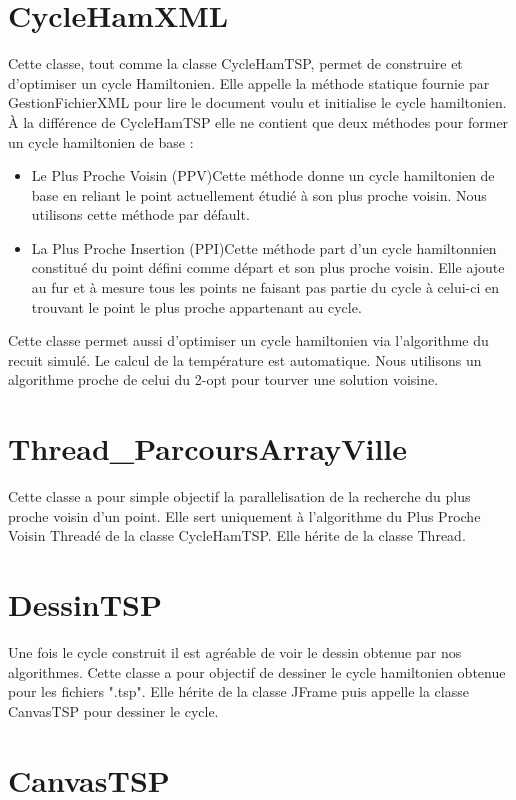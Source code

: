 \documentclass{article}
\begin{document}
\section{CycleHamXML}

Cette classe, tout comme la classe CycleHamTSP, permet de construire et d'optimiser un cycle Hamiltonien.
Elle appelle la méthode statique fournie par GestionFichierXML pour lire le document voulu et initialise le cycle hamiltonien.
À la différence de CycleHamTSP elle ne contient que deux méthodes pour former un cycle hamiltonien de base :
\begin{itemize}
\item{Le Plus Proche Voisin (PPV)}{Cette méthode donne un cycle hamiltonien de base en reliant le point actuellement étudié à son plus proche voisin. Nous utilisons cette méthode par défault.}
\item{La Plus Proche Insertion (PPI)}{Cette méthode part d'un cycle hamiltonnien constitué du point défini comme départ et son plus proche voisin. Elle ajoute au fur et à mesure tous les points ne faisant pas partie du cycle à celui-ci en trouvant le point le plus proche appartenant au cycle.}
\end{itemize}
Cette classe permet aussi d'optimiser un cycle hamiltonien via l'algorithme du recuit simulé. Le calcul de la température est automatique. Nous utilisons un algorithme proche de celui du 2-opt pour tourver une solution voisine.

\section{Thread_ParcoursArrayVille}

Cette classe a pour simple objectif la parallelisation de la recherche du plus proche voisin d'un point. Elle sert uniquement à l'algorithme du Plus Proche Voisin Threadé de la classe CycleHamTSP. Elle hérite de la classe Thread.

\section{DessinTSP}

Une fois le cycle construit il est agréable de voir le dessin obtenue par nos algorithmes. Cette classe a pour objectif de dessiner le cycle hamiltonien obtenue pour les fichiers ".tsp". Elle hérite de la classe JFrame puis appelle la classe CanvasTSP pour dessiner le cycle.

\section{CanvasTSP}
\end{document}
